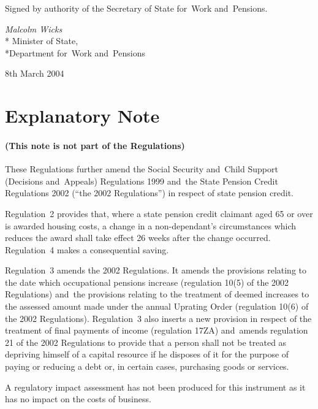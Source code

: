 \documentclass[12pt,a4paper]{article}
\begin{document}
\bigskip

Signed 
by authority of the 
Secretary of State for~Work and~Pensions.

{\raggedleft
\emph{Malcolm Wicks}\\*
Minister
of State,\\*Department 
for~Work and~Pensions

}

8th March 2004

\small

\part{Explanatory Note}

\renewcommand\parthead{— Explanatory Note}

\subsection*{(This note is not part of the Regulations)}

These Regulations further amend the Social Security and~Child Support (Decisions and~Appeals) Regulations 1999 and~the State Pension Credit Regulations 2002 (“the 2002 Regulations”) in respect of state pension credit.

Regulation~2 provides that, where a state pension credit claimant aged 65 or over is awarded housing costs, a change in a non-dependant’s circumstances which reduces the award shall take effect 26 weeks after the change occurred. Regulation~4 makes a consequential saving.

Regulation~3 amends the 2002 Regulations. It amends the provisions relating to the date which occupational pensions increase (regulation 10(5) of the 2002 Regulations) and~the provisions relating to the treatment of deemed increases to the assessed amount made under the annual Uprating Order (regulation 10(6) of the 2002 Regulations). Regulation~3 also inserts a new provision in respect of the treatment of final payments of income (regulation 17ZA) and~amends regulation 21 of the 2002 Regulations to provide that a person shall not be treated as depriving himself of a capital resource if he disposes of it for the purpose of paying or reducing a debt or, in certain cases, purchasing goods or services.

A regulatory impact assessment has not been produced for this instrument as it has no impact on the costs of business. 
\end{document}
